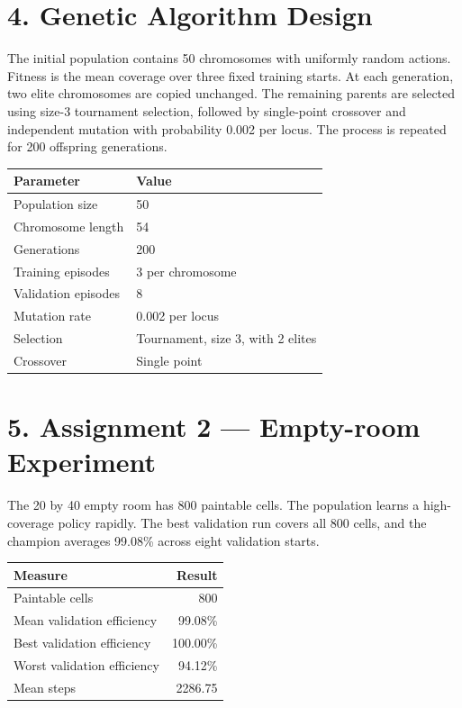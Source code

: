 \documentclass[12pt,a4paper]{article}
\begin{document}
\section*{4. Genetic Algorithm Design}

The initial population contains 50 chromosomes with uniformly random actions. Fitness is the mean coverage over three fixed training starts. At each generation, two elite chromosomes are copied unchanged. The remaining parents are selected using size-3 tournament selection, followed by single-point crossover and independent mutation with probability 0.002 per locus. The process is repeated for 200 offspring generations.

\begin{center}
\begin{tabular}{@{}ll@{}}
\toprule
\textbf{Parameter} & \textbf{Value} \\
\midrule
Population size & 50 \\
Chromosome length & 54 \\
Generations & 200 \\
Training episodes & 3 per chromosome \\
Validation episodes & 8 \\
Mutation rate & 0.002 per locus \\
Selection & Tournament, size 3, with 2 elites \\
Crossover & Single point \\
\bottomrule
\end{tabular}
\end{center}

\section*{5. Assignment 2 --- Empty-room Experiment}

The 20 by 40 empty room has 800 paintable cells. The population learns a high-coverage policy rapidly. The best validation run covers all 800 cells, and the champion averages 99.08\% across eight validation starts.

\begin{center}
\begin{tabular}{@{}lr@{}}
\toprule
\textbf{Measure} & \textbf{Result} \\
\midrule
Paintable cells & 800 \\
Mean validation efficiency & 99.08\% \\
Best validation efficiency & 100.00\% \\
Worst validation efficiency & 94.12\% \\
Mean steps & 2286.75 \\
\bottomrule
\end{tabular}
\end{center}
\end{document}
